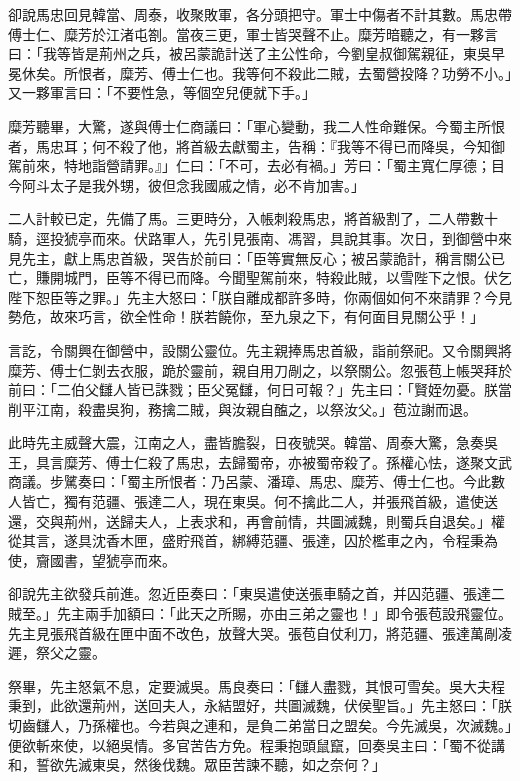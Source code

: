 卻說馬忠回見韓當、周泰，收聚敗軍，各分頭把守。軍士中傷者不計其數。馬忠帶傅士仁、糜芳於江渚屯劄。當夜三更，軍士皆哭聲不止。糜芳暗聽之，有一夥言曰：「我等皆是荊州之兵，被呂蒙詭計送了主公性命，今劉皇叔御駕親征，東吳早冕休矣。所恨者，糜芳、傅士仁也。我等何不殺此二賊，去蜀營投降？功勞不小。」又一夥軍言曰：「不要性急，等個空兒便就下手。」

糜芳聽畢，大驚，遂與傅士仁商議曰：「軍心變動，我二人性命難保。今蜀主所恨者，馬忠耳；何不殺了他，將首級去獻蜀主，告稱：『我等不得已而降吳，今知御駕前來，特地詣營請罪。』」仁曰：「不可，去必有禍。」芳曰：「蜀主寬仁厚德；目今阿斗太子是我外甥，彼但念我國戚之情，必不肯加害。」

二人計較已定，先備了馬。三更時分，入帳刺殺馬忠，將首級割了，二人帶數十騎，逕投猇亭而來。伏路軍人，先引見張南、馮習，具說其事。次日，到御營中來見先主，獻上馬忠首級，哭告於前曰：「臣等實無反心；被呂蒙詭計，稱言關公已亡，賺開城門，臣等不得已而降。今聞聖駕前來，特殺此賊，以雪陛下之恨。伏乞陛下恕臣等之罪。」先主大怒曰：「朕自離成都許多時，你兩個如何不來請罪？今見勢危，故來巧言，欲全性命！朕若饒你，至九泉之下，有何面目見關公乎！」

言訖，令關興在御營中，設關公靈位。先主親捧馬忠首級，詣前祭祀。又令關興將糜芳、傅士仁剝去衣服，跪於靈前，親自用刀剮之，以祭關公。忽張苞上帳哭拜於前曰：「二伯父讎人皆已誅戮；臣父冤讎，何日可報？」先主曰：「賢姪勿憂。朕當削平江南，殺盡吳狗，務擒二賊，與汝親自醢之，以祭汝父。」苞泣謝而退。

此時先主威聲大震，江南之人，盡皆膽裂，日夜號哭。韓當、周泰大驚，急奏吳王，具言糜芳、傅士仁殺了馬忠，去歸蜀帝，亦被蜀帝殺了。孫權心怯，遂聚文武商議。步騭奏曰：「蜀主所恨者：乃呂蒙、潘璋、馬忠、糜芳、傅士仁也。今此數人皆亡，獨有范疆、張達二人，現在東吳。何不擒此二人，并張飛首級，遣使送還，交與荊州，送歸夫人，上表求和，再會前情，共圖滅魏，則蜀兵自退矣。」權從其言，遂具沈香木匣，盛貯飛首，綁縛范疆、張達，囚於檻車之內，令程秉為使，齎國書，望猇亭而來。

卻說先主欲發兵前進。忽近臣奏曰：「東吳遣使送張車騎之首，并囚范疆、張達二賊至。」先主兩手加額曰：「此天之所賜，亦由三弟之靈也！」即令張苞設飛靈位。先主見張飛首級在匣中面不改色，放聲大哭。張苞自仗利刀，將范疆、張達萬剮凌遲，祭父之靈。

祭畢，先主怒氣不息，定要滅吳。馬良奏曰：「讎人盡戮，其恨可雪矣。吳大夫程秉到，此欲還荊州，送回夫人，永結盟好，共圖滅魏，伏侯聖旨。」先主怒曰：「朕切齒讎人，乃孫權也。今若與之連和，是負二弟當日之盟矣。今先滅吳，次滅魏。」便欲斬來使，以絕吳情。多官苦告方免。程秉抱頭鼠竄，回奏吳主曰：「蜀不從講和，誓欲先滅東吳，然後伐魏。眾臣苦諫不聽，如之奈何？」

